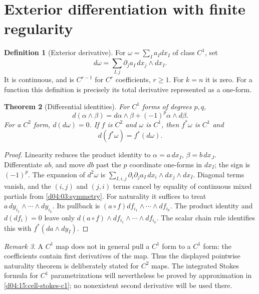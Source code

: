 \documentclass[11pt,oneside,openany]{book}
\newtheorem{theorem}{Theorem}[chapter]
\theoremstyle{definition}
\newtheorem{definition}[theorem]{Definition}
\theoremstyle{remark}
\newtheorem{remark}[theorem]{Remark}
\newcommand{\family}[1]{}
\begin{document}
\section{Exterior differentiation with finite regularity}
\family{K04.13.05}\family{K04.13.06}\family{K04.13.07}
\begin{definition}[Exterior derivative]\label{d04:13:exterior-derivative}
For $\omega=\sum_I a_I dx_I$ of class $C^1$, set
\[
 d\omega=\sum_{I,j}\partial_j a_I\,dx_j\wedge dx_I.
\]
It is continuous, and is $C^{r-1}$ for $C^r$ coefficients, $r\ge1$.
For $k=n$ it is zero. For a function this definition is precisely its total
derivative represented as a one-form.
\end{definition}

\begin{theorem}[Differential identities]\label{d04:13:d-rules}
For $C^1$ forms of degrees $p,q$,
\[
 d(\alpha\wedge\beta)=d\alpha\wedge\beta+(-1)^p\alpha\wedge d\beta.
\]
For a $C^2$ form, $d(d\omega)=0$. If $f$ is $C^2$ and $\omega$ is $C^1$,
then $f^*\omega$ is $C^1$ and
\[
 d(f^*\omega)=f^*(d\omega).
\]
\end{theorem}
\begin{proof}
Linearity reduces the product identity to $\alpha=a\,dx_I$,
$\beta=b\,dx_J$. Differentiate $ab$, and move $db$ past the $p$ coordinate
one-forms in $dx_I$; the sign is $(-1)^p$. The expansion of $d^2\omega$ is
$\sum_{I,i,j}\partial_i\partial_j a_I\,dx_i\wedge dx_j\wedge dx_I$.
Diagonal terms vanish, and the $(i,j)$ and $(j,i)$ terms cancel by equality
of continuous mixed partials from \cref{d04:03:symmetry}.
For naturality it suffices to treat $a\,dy_{i_1}\wedge\cdots\wedge dy_{i_k}$.
Its pullback is $(a\circ f)df_{i_1}\wedge\cdots\wedge df_{i_k}$.
The product identity and $d(df_i)=0$ leave only
$d(a\circ f)\wedge df_{i_1}\wedge\cdots\wedge df_{i_k}$.
The scalar chain rule identifies this with $f^*(da\wedge dy_I)$.
\end{proof}

\begin{remark}\label{d04:13:regularity-warning}
A $C^1$ map does not in general pull a $C^1$ form to a $C^1$ form:
the coefficients contain first derivatives of the map. Thus the displayed
pointwise naturality theorem is deliberately stated for $C^2$ maps. The
integrated Stokes formula for $C^1$ parametrizations will nevertheless be
proved by approximation in \cref{d04:15:cell-stokes-c1}; no nonexistent second
derivative will be used there.
\end{remark}
\end{document}
